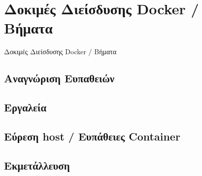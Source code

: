 \section{Δοκιμές Διείσδυσης \textlatin{Docker} / Βήματα}
\label{dockerPenTesting}

Δοκιμές Διείσδυσης \textlatin{Docker} / Βήματα

\subsection{Αναγνώριση Ευπαθειών}
\subsection{Εργαλεία}
\subsection{Εύρεση \textlatin{host} / Ευπάθειες \textlatin{Container}}
\subsection{Εκμετάλλευση}

